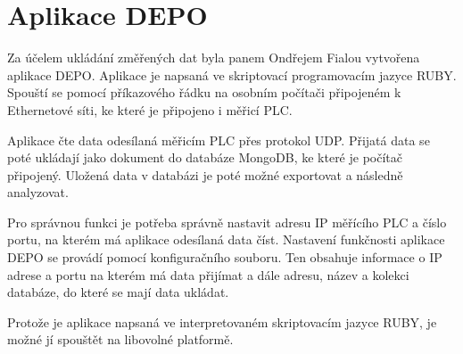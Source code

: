 \section{Aplikace DEPO} 
\label{aplikacedepo}
Za účelem ukládání změřených dat byla panem Ondřejem Fialou vytvořena aplikace DEPO. Aplikace je napsaná ve skriptovací programovacím jazyce RUBY. Spouští se pomocí příkazového řádku na osobním počítači připojeném k Ethernetové síti, ke které je připojeno i měřicí PLC. 

Aplikace čte data odesílaná měřicím PLC přes protokol UDP. Přijatá data se poté ukládají jako dokument do databáze MongoDB, ke které je počítač připojený. Uložená data v databázi je poté možné exportovat a následně analyzovat.

Pro správnou funkci je potřeba správně nastavit adresu IP měřícího PLC a číslo portu, na kterém má aplikace odesílaná data číst. Nastavení funkčnosti aplikace DEPO se provádí pomocí konfiguračního souboru. Ten obsahuje informace o IP adrese a portu na kterém má data přijímat a dále adresu, název a kolekci databáze, do které se mají data ukládat.

Protože je aplikace napsaná ve interpretovaném skriptovacím jazyce RUBY, je možné jí spouštět na libovolné platformě.
